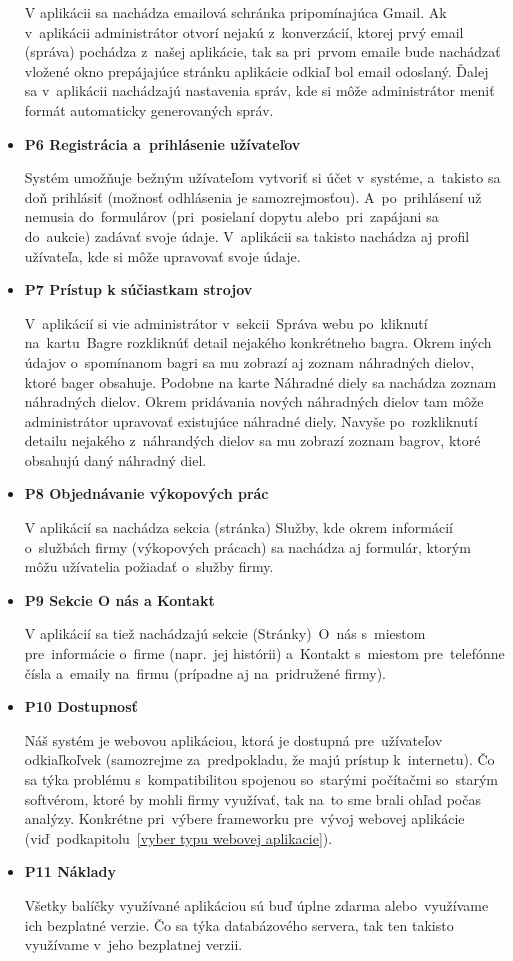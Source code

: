 \begin{itemize}
V aplikácii sa nachádza emailová schránka pripomínajúca Gmail. Ak v~aplikácii administrátor otvorí nejakú z~konverzácií, ktorej prvý email (správa) pochádza z~našej aplikácie, tak sa pri~prvom emaile bude nachádzať vložené okno prepájajúce stránku aplikácie odkiaľ bol email odoslaný. Ďalej sa v~aplikácii nachádzajú nastavenia správ, kde si môže administrátor meniť formát automaticky generovaných správ.

\item \textbf{P6 Registrácia a~prihlásenie užívateľov}

Systém umožňuje bežným užívateľom vytvoriť si účet v~systéme, a~takisto sa doň prihlásiť (možnosť odhlásenia je samozrejmosťou). A~po~prihlásení už nemusia do~formulárov (pri~posielaní dopytu alebo~pri~zapájani sa do~aukcie) zadávať svoje údaje. V~aplikácii sa takisto nachádza aj profil užívateľa, kde si môže upravovať svoje údaje.

\item \textbf{P7 Prístup k súčiastkam strojov}

V~aplikácií si vie administrátor v~sekcii~Správa webu po~kliknutí na~kartu~Bagre rozkliknúť detail nejakého konkrétneho bagra. Okrem iných údajov o~spomínanom bagri sa mu zobrazí aj zoznam náhradných dielov, ktoré bager obsahuje. Podobne na karte Náhradné diely sa nachádza zoznam náhradných dielov. Okrem pridávania nových náhradných dielov tam môže administrátor upravovať existujúce náhradné diely. Navyše po~rozkliknutí detailu nejakého z~náhrandých dielov sa mu zobrazí zoznam bagrov, ktoré obsahujú daný náhradný diel.

\item \textbf{P8 Objednávanie výkopových prác}

V aplikácií sa nachádza sekcia (stránka) Služby, kde okrem informácií o~službách firmy (výkopových prácach) sa nachádza aj formulár, ktorým môžu užívatelia požiadať o~služby firmy.

\item \textbf{P9 Sekcie O nás a Kontakt}

V aplikácií sa tiež nachádzajú sekcie (Stránky)~O~nás s~miestom pre~informácie o~firme (napr.~jej histórii) a~Kontakt s~miestom pre~telefónne čísla a~emaily na~firmu (prípadne aj na~pridružené firmy).

\item \textbf{P10 Dostupnosť}

Náš systém je webovou aplikáciou, ktorá je dostupná pre~užívateľov odkiaľkoľvek (samozrejme za~predpokladu, že majú prístup k~internetu). Čo sa týka problému s~kompatibilitou spojenou so~starými počítačmi so~starým softvérom, ktoré by mohli firmy využívať, tak na~to sme brali ohľad počas analýzy. Konkrétne pri~výbere frameworku pre~vývoj webovej aplikácie (viď~podkapitolu~\ref{vyber typu webovej aplikacie}).

\item \textbf{P11 Náklady}

Všetky balíčky využívané aplikáciou sú buď úplne zdarma alebo~využívame ich bezplatné verzie. Čo sa týka databázového servera, tak ten takisto využívame v~jeho bezplatnej verzii.
\end{itemize}

